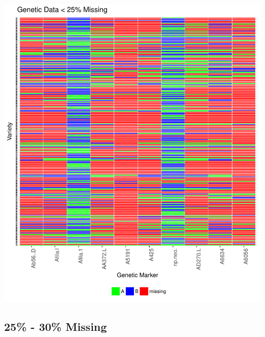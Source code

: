 \documentclass[11pt]{article}\usepackage[]{graphicx}\usepackage[]{color}
\makeatletter
\def\maxwidth{ %
  \ifdim\Gin@nat@width>\linewidth
    \linewidth
  \else
    \Gin@nat@width
  \fi
}
\newenvironment{knitrout}{}{} %
\makeatother
\begin{document}
\begin{knitrout}\footnotesize
{}\color{fgcolor}

{\centering \includegraphics[width=\maxwidth]{figure/missing_plot25-1} 

}



\end{knitrout}
\pagebreak
\subsection{25\% - 30\% Missing}
\end{document}
